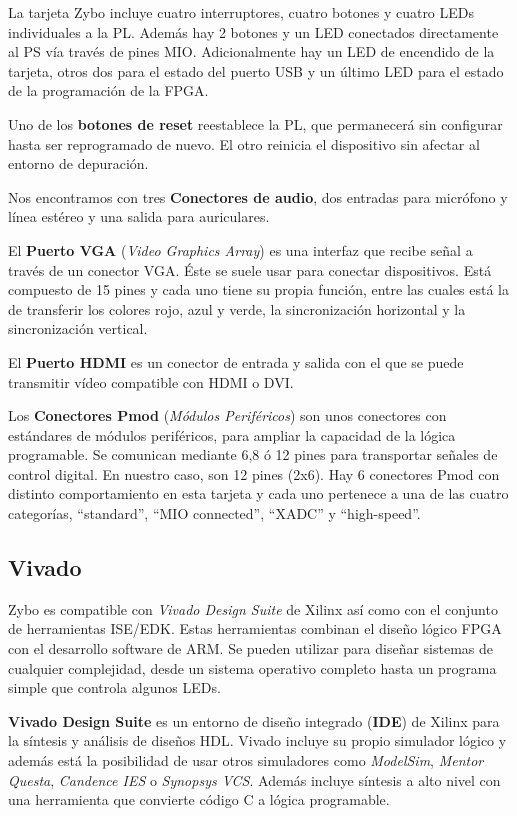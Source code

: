 La tarjeta Zybo incluye cuatro interruptores, cuatro botones y cuatro LEDs individuales a la PL. Además hay 2 botones y un LED conectados 
directamente al PS vía través de pines MIO. Adicionalmente hay un LED de encendido de la tarjeta, otros dos para el estado del puerto USB 
y un último LED para el estado de la programación de la FPGA.

Uno de los \textbf{botones de reset} reestablece la PL, que permanecerá sin configurar hasta ser reprogramado de nuevo. El otro reinicia 
el dispositivo sin afectar al entorno de depuración. 

Nos encontramos con tres \textbf{Conectores de audio}, dos entradas para micrófono y línea estéreo y una salida para auriculares.

El \textbf{Puerto VGA} (\textit{Video Graphics Array}) es una interfaz que recibe señal a través de un conector VGA. Éste se suele usar 
para conectar dispositivos. Está compuesto de 15 pines y cada uno tiene su propia función, entre las cuales está la de transferir los 
colores rojo, azul y verde, la sincronización horizontal y la sincronización vertical. 

El \textbf{Puerto HDMI} es un conector de entrada y salida con el que se puede transmitir vídeo compatible con HDMI o DVI. 

Los \textbf{Conectores Pmod} (\textit{Módulos Periféricos}) son unos conectores con estándares de módulos periféricos, para ampliar la capacidad de la 
lógica programable. Se comunican mediante 6,8 ó 12 pines para transportar señales de control digital. En nuestro caso, son 12 pines (2x6). 
Hay 6 conectores Pmod con distinto comportamiento en esta tarjeta y cada uno pertenece a una de las cuatro categorías, ``standard'', ``MIO connected'', 
``XADC'' y ``high-speed''.


\subsection{Vivado}

Zybo es compatible con \textit{Vivado Design Suite} de Xilinx así como con el conjunto de herramientas ISE/EDK.
Estas herramientas combinan el diseño lógico FPGA con el desarrollo software de ARM. Se pueden utilizar para diseñar sistemas 
de cualquier complejidad, desde un sistema operativo completo hasta un programa simple que controla algunos LEDs.

\textbf{Vivado Design Suite} es un entorno de diseño integrado (\textbf{IDE}) de Xilinx para la síntesis y análisis de diseños HDL. Vivado incluye 
su propio simulador lógico y además está la posibilidad de usar otros simuladores como \textit{ModelSim}, \textit{Mentor Questa}, 
\textit{Candence IES} o \textit{Synopsys VCS}. Además incluye síntesis a alto nivel con una herramienta que convierte código C a lógica
 programable.

